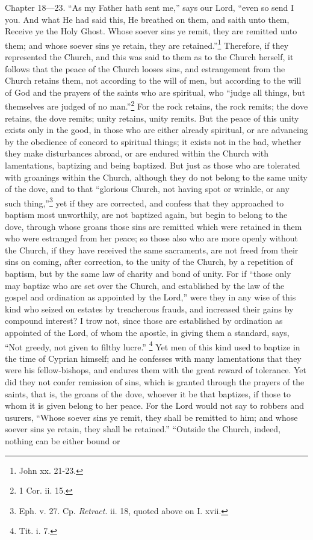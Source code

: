 
Chapter 18—23. ``As my Father hath sent me,'' says our Lord, ``even so send I you. And what He had said this, He breathed on them, and saith unto them, Receive ye the Holy Ghost. Whose soever sins ye remit, they are remitted unto them; and whose soever sins ye retain, they are retained.''\footnote{\par  John xx. 21-23.} Therefore, if they represented the Church, and this was said to them as to the Church herself, it follows that the peace of the Church looses sins, and estrangement from the Church retains them, not according to the will of men, but according to the will of God and the prayers of the saints who are spiritual, who ``judge all things, but themselves are judged of no man.''\footnote{\par  1 Cor. ii. 15.} For the rock retains, the rock remits; the dove retains, the dove remits; unity retains, unity remits. But the peace of this unity exists only in the good, in those who are either already spiritual, or are advancing by the obedience of concord to spiritual things; it exists not in the bad, whether they make disturbances abroad, or are endured within the Church with lamentations, baptizing and being baptized. But just as those who are tolerated with groanings within the Church, although they do not belong to the same unity of the dove, and to that ``glorious Church, not having spot or wrinkle, or any such thing,''\footnote{\par  Eph. v. 27. Cp. \emph{ Retract}. ii. 18, quoted above on I. xvii.} yet if they are corrected, and confess that they approached to baptism most unworthily, are not baptized again, but begin to belong to the dove, through whose groans those sins are remitted which were retained in them who were estranged from her peace; so those also who are more openly without the Church, if they have received the same sacraments, are not freed from their sins on coming, after correction, to the unity of the Church, by a repetition of baptism, but by the same law of charity and bond of unity. For if ``those only may baptize who are set over the Church, and established by the law of the gospel and ordination as appointed by the Lord,'' were they in any wise of this kind who seized on estates by treacherous frauds, and increased their gains by compound interest? I trow not, since those are established by ordination as appointed of the Lord, of whom the apostle, in giving them a standard, says, ``Not greedy, not given to filthy lucre.'' \footnote{\par  Tit. i. 7.} Yet men of this kind used to baptize in the time of Cyprian himself; and he confesses with many lamentations that they were his fellow-bishops, and endures them with the great reward of tolerance. Yet did they not confer remission of sins, which is granted through the prayers of the saints, that is, the groans of the dove, whoever it be that baptizes, if those to whom it is given belong to her peace. For the Lord would not say to robbers and usurers, ``Whose soever sins ye remit, they shall be remitted to him; and whose soever sins ye retain, they shall be retained.'' ``Outside the Church, indeed, nothing can be either bound or 